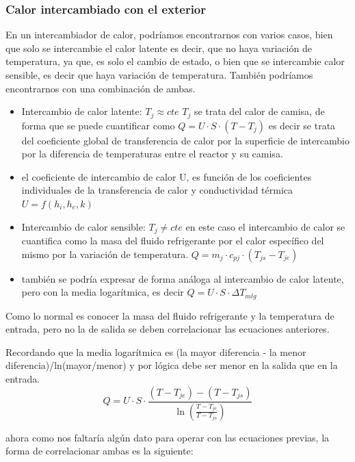 \subsubsection{Calor intercambiado con el exterior}
En un intercambiador de calor, podríamos encontrarnos con varios casos, bien que solo se intercambie el calor latente es decir, que no haya variación de temperatura, ya que, es solo el cambio de estado, o bien que se intercambie calor sensible, es decir que haya variación de temperatura.
También podríamos encontrarnos con una combinación de ambas.
\begin{itemize}
  \item Intercambio de calor latente: $T_j \approx cte$ $T_j$ se trata del calor de camisa, de forma que se puede cuantificar como $Q = U\cdot S \cdot (T-T_j)$ es decir se trata del coeficiente global de transferencia de calor por la superficie de intercambio por la diferencia de temperaturas entre el reactor y su camisa.
  \item []el coeficiente de intercambio de calor U, es función de los coeficientes individuales de la transferencia de calor y conductividad térmica $U = f(h_i,h_e,k)$
  \item Intercambio de calor sensible: $T_j \neq cte$ en este caso el intercambio de calor se cuantifica como la masa del fluido refrigerante por el calor específico del mismo por la variación de temperatura. $Q = m_j \cdot c_{pj} \cdot (T_{js}-T_{je})$
  \item []también se podría expresar de forma análoga al intercambio de calor latente, pero con la media logarítmica, es decir $Q = U\cdot S \cdot \Delta T_{mlg}$
\end{itemize}
Como lo normal es conocer la masa del fluido refrigerante y la temperatura de entrada, pero no la de salida se deben correlacionar las ecuaciones anteriores.
\begin{note}
  Recordando que la media logarítmica es (la mayor diferencia - la menor diferencia)/ln(mayor/menor) y por lógica debe ser menor en la salida que en la entrada.
  \begin{equation*}
    Q = U \cdot S \cdot \frac{(T-T_{je})-(T-T_{js})}{\ln\left(\frac{T-T_{je}}{T-T_{js}}\right)}
  \end{equation*}
\end{note}
\noindent ahora como nos faltaría algún dato para operar con las ecuaciones previas, la forma de correlacionar ambas es la siguiente:
\newpage
